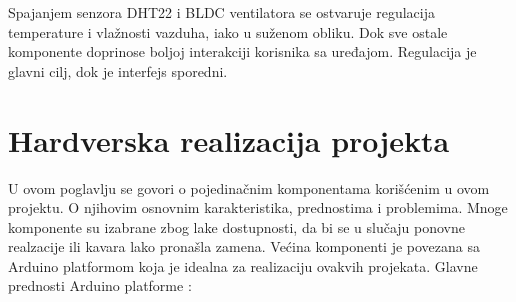 \documentclass[a4paper, 12pt]{article}
\begin{document}
Spajanjem senzora DHT22 i BLDC ventilatora se ostvaruje regulacija temperature i vlažnosti vazduha, iako u suženom obliku. Dok sve ostale komponente doprinose boljoj interakciji korisnika sa uređajom. Regulacija je glavni cilj, dok je interfejs sporedni.

\pagebreak
\endgroup

\begingroup
\justifying
\section{Hardverska realizacija projekta}

\vspace{10pt}

U ovom poglavlju se govori o pojedinačnim komponentama korišćenim u ovom projektu. O njihovim osnovnim karakteristika, prednostima i problemima. Mnoge komponente su izabrane zbog lake dostupnosti, da bi se u slučaju ponovne realzacije ili kavara lako pronašla zamena. Većina komponenti je povezana sa Arduino platformom koja je idealna za realizaciju ovakvih projekata. Glavne prednosti Arduino platforme :
\end{document}

